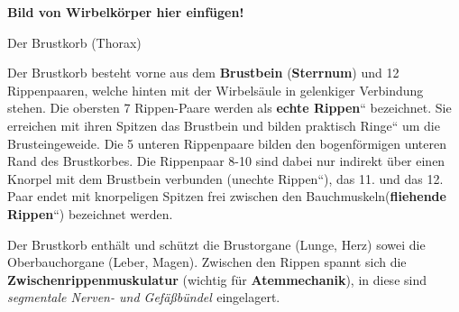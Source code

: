 \documentclass{article}
\newcommand\gEs[1]{\textbf{\textcolor[rgb]{0.0,0.0,0.5019608}{#1}}}
\newcommand\gEs[1]{\textbf{\textcolor[rgb]{0.0,0.0,0.5019608}{#1}}}
\newcommand\gT[1]{\textbf{\textup{\textcolor[rgb]{0.0,0.5019608,0.0}{#1}}}}
\newcommand\gE[1]{\textit{#1}}
\begin{document}
{\bfseries\color[rgb]{0.5019608,0.0,0.0}
Bild von Wirbelk\"orper hier einf\"ugen!}

{\mdseries\color[rgb]{0.0,0.0,0.5019608}
Der Brustkorb (Thorax)}

{\mdseries
Der  Brustkorb besteht vorne aus dem \gT{Brustbein}
(\gT{Sterrnum}) und 12 Rippenpaaren, welche hinten mit
der Wirbels\"aule in gelenkiger Verbindung stehen. Die obersten 7
Rippen-Paare werden als  {\quotedblbase}\gT{echte
Rippen}{\textquotedblleft} bezeichnet. Sie erreichen mit ihren Spitzen
das Brustbein und bilden praktisch
{\quotedblbase}Ringe{\textquotedblleft} um die Brusteingeweide. Die 5
unteren Rippenpaare bilden den bogenf\"ormigen unteren Rand des
Brustkorbes. Die Rippenpaar 8-10 sind dabei nur indirekt \"uber einen
Knorpel mit dem Brustbein verbunden ({\quotedblbase}unechte
Rippen{\textquotedblleft}), das 11. und das 12. Paar endet mit
knorpeligen Spitzen frei zwischen den
Bauchmuskeln({\quotedblbase}\gT{fliehende
Rippen}{\textquotedblleft}) bezeichnet werden.}

{\mdseries
Der Brustkorb enth\"alt und sch\"utzt die Brust\-organe (Lunge, Herz)
sowei die Oberbauchorgane (Leber, Magen). Zwischen den Rippen spannt
sich die \gT{Zwischenrippenmuskulatur} (wichtig f\"ur
\gEs{Atemmechanik}), in diese sind
\gE{segmentale Nerven- und
Gef\"a{\ss}b\"undel}\gEs{ }eingelagert.}
\end{document}
